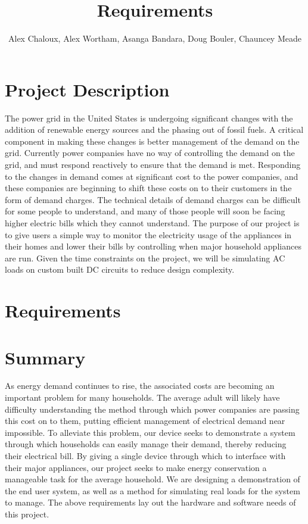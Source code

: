 \documentclass[12pt,letterpaper]{article}
\title{Requirements}
\author{Alex Chaloux, Alex Wortham, Asanga Bandara, Doug Bouler, Chauncey Meade}
\begin{document}
\reqstitlepage

\tableofcontents
\clearpage

\section{Project Description}

The power grid in the United States is undergoing significant changes with
the addition of renewable energy sources and the phasing out of fossil
fuels.  A critical component in making these changes is better management of
the demand on the grid.  Currently power companies have no way of controlling
the demand on the grid, and must respond reactively to ensure that the demand is
met.  Responding to the changes in demand comes at significant cost to the power
companies, and these companies are beginning to shift these costs on to their
customers in the form of demand charges.  The technical details of demand
charges can be difficult for some people to understand, and many of those people
will soon be facing higher electric bills which they cannot understand.  The
purpose of our project is to give users a simple way to monitor the electricity
usage of the appliances in their homes and lower their bills by controlling when
major household appliances are run.  Given the time constraints on the project, we will be
simulating AC loads on custom built DC circuits to reduce design complexity.  


\section{Requirements}

\begin{easylist}[articletoc] \requirements

\end{easylist}

\section{Summary}

As energy demand continues to rise, the associated costs are becoming an
important problem for many households. The average adult will likely have
difficulty understanding the method through which power companies are passing
this cost on to them, putting efficient management of electrical demand near
impossible. To alleviate this problem, our device seeks to demonstrate a system
through which households can easily manage their demand, thereby reducing their
electrical bill. By giving a single device through which to interface with their
major appliances, our project seeks to make energy conservation a manageable
task for the average household. We are designing a demonstration of the end user
system, as well as a method for simulating real loads for the system to manage.
The above requirements lay out the hardware and software needs of this project.
\end{document}
